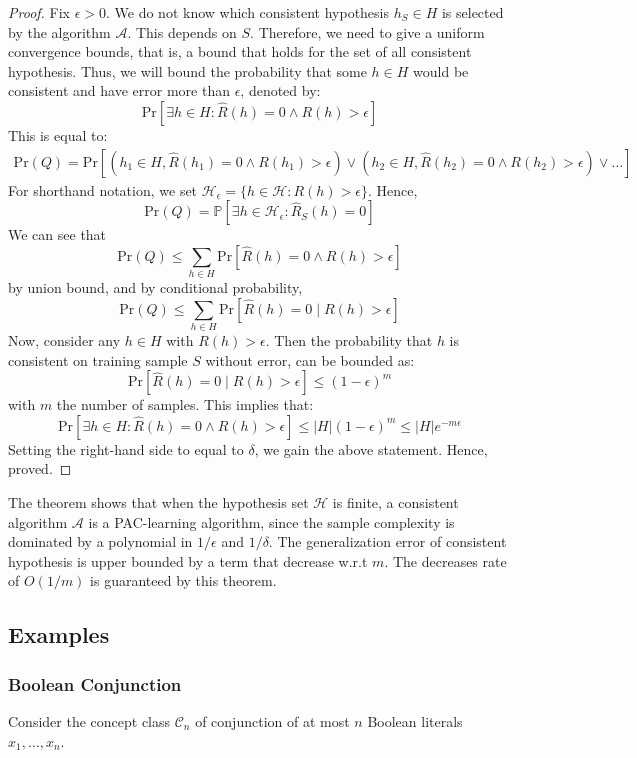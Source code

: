\begin{proof}
    Fix $\epsilon>0$. We do not know which consistent hypothesis $h_{S}\in H$ is selected by the algorithm $\mathcal{A}$. This depends on $S$. Therefore, we need to give a uniform convergence bounds, that is, a bound that holds for the set of all consistent hypothesis. Thus, we will bound the probability that some $h\in H$ would be consistent and have error more than $\epsilon$, denoted by: $$\mathrm{Pr}[\exists h\in H: \hat{R}(h)=0 \land R(h) > \epsilon]$$
This is equal to: 
\begin{multline*}
    \mathrm{Pr}(Q)=\mathrm{Pr}[(h_{1}\in H, \hat{R}(h_{1}) = 0 \land R(h_{1}) > \epsilon) \lor (h_{2}\in H, \hat{R}(h_{2}) = 0 \land R(h_{2}) > \epsilon)\lor\dots]
\end{multline*}
For shorthand notation, we set $\mathcal{H}_{\epsilon}=\{ h\in \mathcal{H} : R(h) > \epsilon \}$. Hence, 
\begin{equation*}
    \mathrm{Pr}(Q)=\mathbb{P}[\exists h\in \mathcal{H}_{\epsilon}: \hat{R}_{S}(h) = 0]
\end{equation*}
We can see that $$\mathrm{Pr}(Q)\leq \sum_{h\in H} \mathrm{Pr}[\hat{R}(h) = 0 \land R(h) > \epsilon]$$
by union bound, and by conditional probability, $$\mathrm{Pr}(Q)\leq \sum_{h\in H} \mathrm{Pr}[\hat{R}(h) = 0 \mid R(h) > \epsilon]$$
Now, consider any $h\in H$ with $R(h)>\epsilon$. Then the probability that $h$ is consistent on training sample $S$ without error, can be bounded as: $$\mathrm{Pr}[\hat{R}(h)=0 \mid R(h) > \epsilon] \leq (1-\epsilon)^{m}$$
with $m$ the number of samples. This implies that: $$\mathrm{Pr}[\exists h\in H: \hat{R}(h)=0 \land R(h) > \epsilon]\leq \lvert H \rvert (1-\epsilon)^{m}\leq \lvert H \rvert e^{-m\epsilon}$$
Setting the right-hand side to equal to $\delta$, we gain the above statement. Hence, proved. 
\end{proof}


The theorem shows that when the hypothesis set $\mathcal{H}$ is finite, a consistent algorithm $\mathcal{A}$ is a PAC-learning algorithm, since the sample complexity is dominated by a polynomial in $1/\epsilon$ and $1/\delta$. The generalization error of consistent hypothesis is upper bounded by a term that decrease w.r.t $m$. The decreases rate of $O(1/m)$ is guaranteed by this theorem. 

\subsection{Examples}
\subsubsection{Boolean Conjunction}
Consider the concept class $\mathcal{C}_{n}$ of conjunction of at most $n$ Boolean literals $x_{1},\dots,x_{n}$. 


